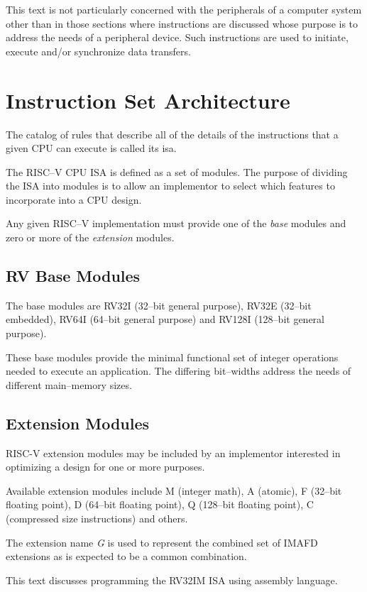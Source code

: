 This text is not particularly concerned with the peripherals of a computer
system other than in those sections where instructions are discussed 
whose purpose is to address the needs of a peripheral device.  Such
instructions are used to initiate, execute and/or synchronize data transfers.


\section{Instruction Set Architecture}

The catalog of rules that describe all of the details of the instructions 
that a given CPU can execute is called its \acrfull{isa}.

The RISC--V CPU ISA is defined as a set of modules.  The purpose of
dividing the ISA into modules is to allow an implementor to select which 
features to incorporate into a CPU design.

Any given RISC--V implementation must provide one of the {\em base}
modules and zero or more of the {\em extension} modules.

\subsection{RV Base Modules}
The base modules are RV32I (32--bit general purpose), 
RV32E (32--bit embedded), RV64I (64--bit general purpose) 
and RV128I (128--bit general purpose).

These base modules provide the minimal functional set of integer operations
needed to execute an application.  The differing bit--widths address
the needs of different main--memory sizes.


\subsection{Extension Modules}

RISC-V extension modules may be included by an implementor interested
in optimizing a design for one or more purposes.

Available extension modules include M (integer math), A (atomic),
F (32--bit floating point), D (64--bit floating point), 
Q (128--bit floating point), C (compressed size instructions) and others.

The extension name {\em G} is used to represent the combined set of IMAFD
extensions as is expected to be a common combination.


This text discusses programming the RV32IM ISA using assembly language. 
